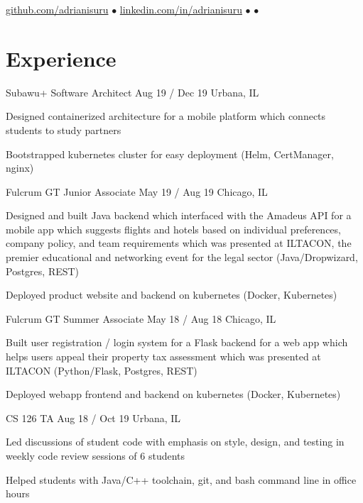\documentclass[hidelinks,11pt]{extarticle}
\begin{document}
\flushleft
{\Huge\bfseries{\color{mycolor}{Adrian Herath}}}

{\small
\href{https://github.com/adrianisuru/}{github.com/adrianisuru}
$\bullet$ %
\href{https://www.linkedin.com/in/adrianisuru/}{linkedin.com/in/adrianisuru}
$\bullet$ %
$\bullet$ %
}

\section{Experience}

\position
{Subawu+}
{Software Architect}
{Aug 19 {\color{mycolor}/} Dec 19}
{Urbana, IL}
{
\item Designed containerized architecture for a mobile platform which connects 
    students to study partners
\item Bootstrapped kubernetes cluster for easy deployment (Helm, CertManager, nginx)
}

\position
{Fulcrum GT}
{Junior Associate}
{May 19 {\color{mycolor}/} Aug 19}
{Chicago, IL}
{
    \item Designed and built Java backend which interfaced with 
            the Amadeus API 
    for a mobile app which suggests
        flights and hotels based on individual preferences, company policy,
        and team requirements 
    which was presented at ILTACON, the premier educational and networking 
        event for the legal sector (Java/Dropwizard, Postgres, REST)
    \item Deployed product website and backend on kubernetes (Docker, Kubernetes)
}

\position
{Fulcrum GT}
{Summer Associate}
{May 18 {\color{mycolor}/} Aug 18}
{Chicago, IL}
{
    \item Built user registration / login system for a Flask backend 
    for a web app which helps users appeal their property tax assessment 
    which was presented at ILTACON (Python/Flask, Postgres, REST)
    \item Deployed webapp frontend and backend on kubernetes (Docker, Kubernetes)
}

\position
{CS 126}
{TA}
{Aug 18 {\color{mycolor}/} Oct 19}
{Urbana, IL}
{
    \item Led discussions of student code with emphasis on style, design, and
        testing in weekly code review sessions of 6 students
    \item Helped students with Java/C++ toolchain, git, and bash command line in
        office hours
}
\end{document}
